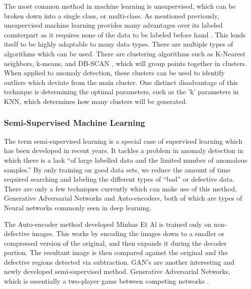 The most common method in machine learning is unsupervised, which can be broken down into a single class, or multi-class.  As mentioned previously, unsupervised machine learning provides many advantages over its labeled counterpart as it requires none of the data to be labeled before hand \cite{chandolaAnomalyDetectionSurvey}.  This lends itself to be highly adaptable to many data types. There are multiple types of algorithms which can be used.  There are clustering algorithms such as K-Nearest neighbors, k-means, and DB-SCAN \cite{xiaoweixuDistributionbasedClusteringAlgorithm1998}, which will group points together in clusters.  When applied to anomaly detection, these clusters can be used to identify outliers which deviate from the main cluster.  One distinct disadvantage of this technique is determining the optimal parameters, such as the 'k' parameters in KNN, which determines how many clusters will be generated.

\subsubsection{Semi-Supervised Machine Learning}

The term semi-supervised learning is a special case of supervised learning which has been developed in recent years.  It tackles a problem in anomaly detection in which there is a lack “of large labelled data and the limited number of anomalous samples.” By only training on good data sets, we reduce the amount of time required searching and labeling the different types of “bad” or defective data. There are only a few techniques currently which can make use of this method, Generative Adversarial Networks and Auto-encoders, both of which are types of Neural networks commonly seen in deep learning. 

The Auto-encoder method developed  Minhas Et Al \cite{minhasSemisupervisedAnomalyDetection2019} is trained only on non-defective images. This works by encoding the images down to a smaller or compressed version of the original, and then expands it during the decoder portion.  The resultant image is then compared against the original and the defective regions detected via subtraction.  GAN's are another interesting and newly developed semi-supervised method.  Generative Adversarial Networks, which is essentially a two-player game between competing networks \cite{goodfellowGenerativeAdversarialNetworks2014a}.


%
%
%

